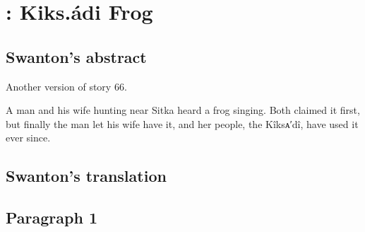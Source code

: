 
\resetexcnt
\chapter{: Kiks.ádi Frog}\label{ch:95-kiks.adi-frog}

\section{Swanton’s abstract}\label{sec:95-swanton-abstract}

Another version of story 66.

A man and his wife hunting near Sitka heard a frog singing.
Both claimed it first, but finally the man let his wife have it, and her people, the Kîksᴀ′dî, have used it ever since.

\section{Swanton’s translation}\label{sec:95-swanton-translation}

\section{Paragraph 1}\label{sec:95-para-1}

